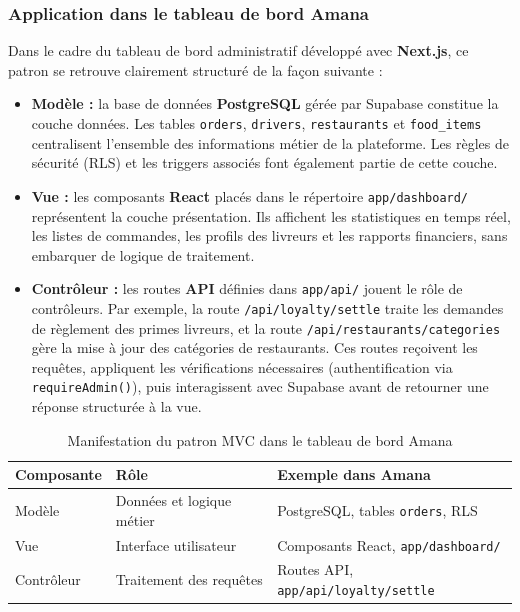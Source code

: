 \documentclass[12pt,fleqn,a4paper]{report}
\begin{document}
\begin{justify}
\subsubsection{Application dans le tableau de bord Amana}

Dans le cadre du tableau de bord administratif développé avec
\textbf{Next.js}, ce patron se retrouve clairement structuré
de la façon suivante :

\begin{itemize}
    \item \textbf{Modèle :} la base de données \textbf{PostgreSQL}
    gérée par Supabase constitue la couche données. Les tables
    \texttt{orders}, \texttt{drivers}, \texttt{restaurants} et
    \texttt{food\_items} centralisent l'ensemble des informations
    métier de la plateforme. Les règles de sécurité (RLS) et les
    triggers associés font également partie de cette couche.

    \item \textbf{Vue :} les composants \textbf{React} placés dans
    le répertoire \texttt{app/dashboard/} représentent la couche
    présentation. Ils affichent les statistiques en temps réel,
    les listes de commandes, les profils des livreurs et les
    rapports financiers, sans embarquer de logique de traitement.

    \item \textbf{Contrôleur :} les routes \textbf{API} définies
    dans \texttt{app/api/} jouent le rôle de contrôleurs. Par
    exemple, la route \texttt{/api/loyalty/settle} traite les
    demandes de règlement des primes livreurs, et la route
    \texttt{/api/restaurants/categories} gère la mise à jour
    des catégories de restaurants. Ces routes reçoivent les
    requêtes, appliquent les vérifications nécessaires
    (authentification via \texttt{requireAdmin()}), puis
    interagissent avec Supabase avant de retourner une réponse
    structurée à la vue.
\end{itemize}

\begin{table}[H]
\centering
\renewcommand{\arraystretch}{1.4}
\begin{tabular}{|l|l|l|}
\hline
\textbf{Composante} & \textbf{Rôle} &
\textbf{Exemple dans Amana} \\
\hline
Modèle & Données et logique métier &
PostgreSQL, tables \texttt{orders}, RLS \\
\hline
Vue & Interface utilisateur &
Composants React, \texttt{app/dashboard/} \\
\hline
Contrôleur & Traitement des requêtes &
Routes API, \texttt{app/api/loyalty/settle} \\
\hline
\end{tabular}
\caption{Manifestation du patron MVC dans le tableau de bord Amana}
\end{table}

\end{justify}
\end{document}
